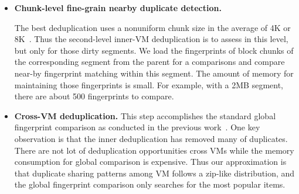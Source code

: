 {\begin{itemize}
\item \textbf{Chunk-level fine-grain nearby duplicate detection.}

The best deduplication uses a nonuniform chunk size 
in the average of 4K or 8K~\cite{??}.
Thus the second-level inner-VM deduplication is to assess in this
level, but only for those dirty  segments. 
We load the fingerprints of block chunks of the corresponding segment from the
parent for a comparisons and compare near-by fingerprint matching within this segment.
The amount of memory for maintaining those fingerprints  is small.
For example, with a 2MB segment, there are about 500 fingerprints to compare.


%

%

\item \textbf{Cross-VM deduplication.}
This step accomplishes the standard global fingerprint  comparison as conducted
in the previous work~\cite{??}.
One key observation is that the inner deduplication has removed many of duplicates.
There are not lot of deduplication opportunities cross VMs while the memory
consumption for global comparison is expensive.
Thus our approximation is that duplicate sharing patterns among  VM follows
a zip-like distribution, and the global fingerprint  comparison  only searches
for the most popular items. 
\end{itemize}

}
